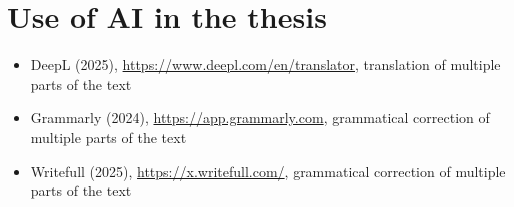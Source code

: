 \setcounter{figure}{0}
\setcounter{listing}{0}

\chapter{Use of AI in the thesis \label{cha:ai-use}}

\begin{itemize}
    \item DeepL (2025), \url{https://www.deepl.com/en/translator}, translation of multiple parts of the text
    \item Grammarly (2024), \url{https://app.grammarly.com}, grammatical correction of multiple parts of the text
    \item Writefull (2025), \url{https://x.writefull.com/}, grammatical correction of multiple parts of the text
\end{itemize}
